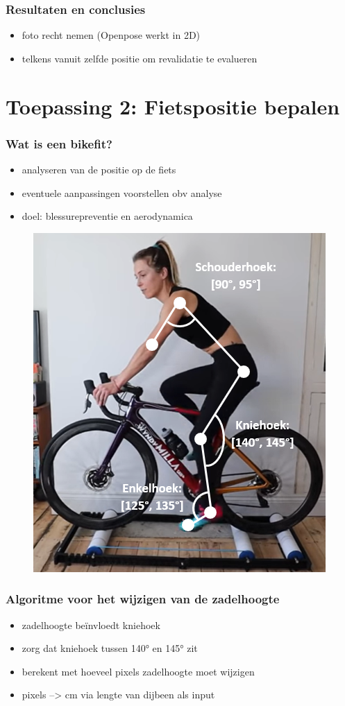 \documentclass
   [kulak] %
   {kulakbeamer}
\begin{document}
\begin{frame}
\frametitle{Resultaten en conclusies}
\begin{itemize}
	\item foto recht nemen (Openpose werkt in 2D)
	\item telkens vanuit zelfde positie om revalidatie te evalueren
\end{itemize}
\end{frame}



\section{Toepassing 2: Fietspositie bepalen}

\begin{frame}
	\frametitle{Wat is een bikefit?}
	\begin{itemize}
		\item analyseren van de positie op de fiets
		\item eventuele aanpassingen voorstellen obv analyse
		\item doel: blessurepreventie en aerodynamica
	\end{itemize}
\begin{figure}
	\includegraphics[width= .4\textwidth]{bikefit_hoeken_foto}
\end{figure}
\end{frame}

\begin{frame}
	\frametitle{Algoritme voor het wijzigen van de zadelhoogte}
	\begin{itemize}
		\item zadelhoogte beïnvloedt kniehoek
		\item zorg dat kniehoek tussen 140° en 145° zit
		\item berekent met hoeveel pixels zadelhoogte moet wijzigen
		\item pixels --> \si{cm} via lengte van dijbeen als input
	\end{itemize}
\end{frame}
\end{document}
